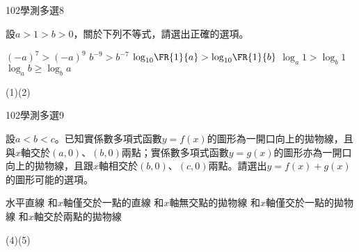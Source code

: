    \begin{QUESTION}
        \begin{ExamInfo}{102}{學測}{多選}{8}
        \end{ExamInfo}
        \begin{ExamAnsRateInfo}{47}{68}{50}{23}
        \end{ExamAnsRateInfo}
        \begin{QBODY}
            設$a>1>b>0$，關於下列不等式，請選出正確的選項。
			\begin{QOPS}
				\QOP ${{(-a)}^{7}}>{{(-a)}^{9}}$
				\QOP ${{b}^{-9}}>{{b}^{-7}}$
				\QOP ${{\log }_{10}}\FR{1}{a}>{{\log }_{10}}\FR{1}{b}$
				\QOP ${{\log }_{a}}1>{{\log }_{b}}1$
				\QOP ${{\log }_{a}}b\ge {{\log }_{b}}a$
			\end{QOPS}
        \end{QBODY}
        \begin{QFROMS}
        \end{QFROMS}
        \begin{QTAGS}\end{QTAGS}
        \begin{QANS}
            (1)(2)
        \end{QANS}
        \begin{QSOLLIST}
        \end{QSOLLIST}
        \begin{QEMPTYSPACE}
        \end{QEMPTYSPACE}
    \end{QUESTION}
    \begin{QUESTION}
        \begin{ExamInfo}{102}{學測}{多選}{9}
        \end{ExamInfo}
        \begin{ExamAnsRateInfo}{43}{64}{40}{25}
        \end{ExamAnsRateInfo}
        \begin{QBODY}
            設$a<b<c$。已知實係數多項式函數$y=f(x)$的圖形為一開口向上的拋物線，且與$x$軸交於$(a,0)$、$(b,0)$兩點；實係數多項式函數$y=g(x)$的圖形亦為一開口向上的拋物線，且跟$x$軸相交於$(b,0)$、$(c,0)$兩點。請選出$y=f(x)+g(x)$的圖形可能的選項。
			\begin{QOPS}
				\QOP 水平直線
				\QOP 和$x$軸僅交於一點的直線
				\QOP 和$x$軸無交點的拋物線
				\QOP 和$x$軸僅交於一點的拋物線
				\QOP 和$x$軸交於兩點的拋物線
			\end{QOPS}
        \end{QBODY}
        \begin{QFROMS}
        \end{QFROMS}
        \begin{QTAGS}\end{QTAGS}
        \begin{QANS}
            (4)(5)
        \end{QANS}
        \begin{QSOLLIST}
        \end{QSOLLIST}
        \begin{QEMPTYSPACE}
        \end{QEMPTYSPACE}
    \end{QUESTION}
